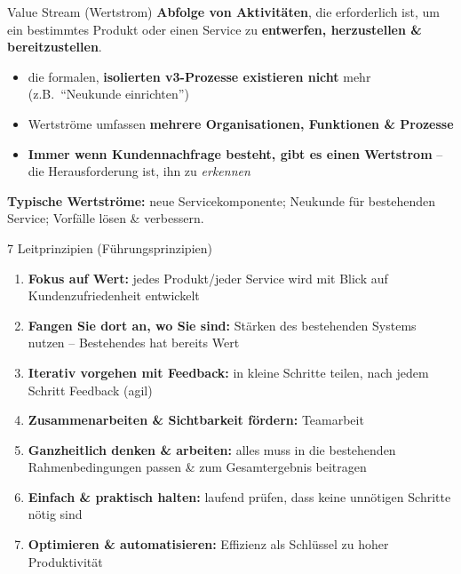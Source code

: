 \documentclass[a4paper, fontsize=7pt]{scrartcl}
\begin{document}
\begin{mainbox}{Value Stream (Wertstrom)}
\textbf{Abfolge von Aktivitäten}, die erforderlich ist, um ein bestimmtes
Produkt oder einen Service zu \textbf{entwerfen, herzustellen \&
bereitzustellen}.
\begin{itemize}
    \item die formalen, \textbf{isolierten v3-Prozesse existieren nicht}
          mehr (z.B.\ ``Neukunde einrichten'')
    \item Wertströme umfassen \textbf{mehrere Organisationen, Funktionen \&
          Prozesse}
    \item \textbf{Immer wenn Kundennachfrage besteht, gibt es einen
          Wertstrom} -- die Herausforderung ist, ihn zu \emph{erkennen}
\end{itemize}
\textbf{Typische Wertströme:} neue Servicekomponente; Neukunde für
bestehenden Service; Vorfälle lösen \& verbessern.
\end{mainbox}

\begin{mainbox}{7 Leitprinzipien (Führungsprinzipien)}
\begin{enumerate}
    \item \textbf{Fokus auf Wert:} jedes Produkt/jeder Service wird mit
          Blick auf Kundenzufriedenheit entwickelt
    \item \textbf{Fangen Sie dort an, wo Sie sind:} Stärken des bestehenden
          Systems nutzen -- Bestehendes hat bereits Wert
    \item \textbf{Iterativ vorgehen mit Feedback:} in kleine Schritte
          teilen, nach jedem Schritt Feedback (agil)
    \item \textbf{Zusammenarbeiten \& Sichtbarkeit fördern:} Teamarbeit
    \item \textbf{Ganzheitlich denken \& arbeiten:} alles muss in die
          bestehenden Rahmenbedingungen passen \& zum Gesamtergebnis
          beitragen
    \item \textbf{Einfach \& praktisch halten:} laufend prüfen, dass keine
          unnötigen Schritte nötig sind
    \item \textbf{Optimieren \& automatisieren:} Effizienz als Schlüssel zu
          hoher Produktivität
\end{enumerate}
\end{mainbox}
\end{document}
